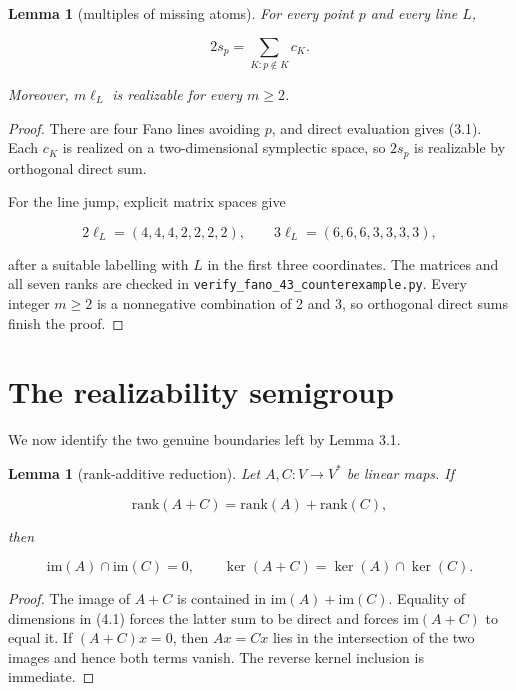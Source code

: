 \documentclass[11pt]{article}
\newtheorem{lemma}[theorem]{Lemma}
\theoremstyle{remark}
\numberwithin{equation}{section}
\begin{document}
\Needspace{0.28\textheight}
\begin{lemma}[multiples of missing atoms]

For every point $p$ and every line $L$,

\nopagebreak[4]
\[
2s_p=\sum_{K:p\notin K}c_K.
\tag{3.1}
\]

Moreover, $m\ell_L$ is realizable for every $m\ge2$.

\end{lemma}

\begin{proof}

There are four Fano lines avoiding $p$, and direct evaluation gives (3.1).
Each $c_K$ is realized on a two-dimensional symplectic space, so $2s_p$ is
realizable by orthogonal direct sum.

For the line jump, explicit matrix spaces give

\nopagebreak[4]
\[
2\ell_L=(4,4,4,2,2,2,2),
\qquad
3\ell_L=(6,6,6,3,3,3,3),
\tag{3.2}
\]

after a suitable labelling with $L$ in the first three coordinates. The
matrices and all seven ranks are checked in
\nolinkurl{verify_fano_43_counterexample.py}. Every integer $m\ge2$ is a nonnegative
combination of 2 and 3, so orthogonal direct sums finish the proof.
\end{proof}


\section{The realizability semigroup}


We now identify the two genuine boundaries left by Lemma 3.1.

\Needspace{0.28\textheight}
\begin{lemma}[rank-additive reduction]

Let $A,C:V\to V^*$ be linear maps. If

\nopagebreak[4]
\[
\mathrm{rank}(A+C)=\mathrm{rank}(A)+\mathrm{rank}(C),
\tag{4.1}
\]

then

\nopagebreak[4]
\[
\mathrm{im}(A)\cap\mathrm{im}(C)=0,
\qquad
\ker(A+C)=\ker(A)\cap\ker(C).
\tag{4.2}
\]

\end{lemma}

\begin{proof}

The image of $A+C$ is contained in $\mathrm{im}(A)+\mathrm{im}(C)$.
Equality of dimensions in (4.1) forces the latter sum to be direct and forces
$\mathrm{im}(A+C)$ to equal it. If $(A+C)x=0$, then $Ax=Cx$ lies in the
intersection of the two images and hence both terms vanish. The reverse kernel
inclusion is immediate.
\end{proof}
\end{document}
